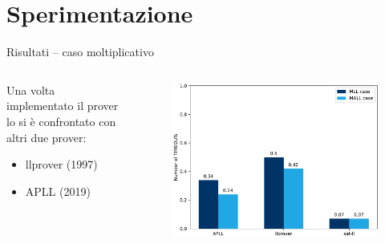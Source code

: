 \documentclass{beamer}
\begin{document}
\section{Sperimentazione}
\begin{frame}{Risultati -- caso moltiplicativo}
	\begin{columns}
		\begin{column}{.5\textwidth}
			Una volta implementato il prover lo si è confrontato con altri due prover:
			\begin{itemize}
				\item llprover (1997)
				\item APLL (2019)
			\end{itemize}
		\end{column}
		\begin{column}{.5\textwidth}
			\begin{figure}[H]
				\centering
				\includegraphics[scale=.4]{images/graph}
			\end{figure}
		\end{column}
	\end{columns}
\end{frame}
\end{document}
